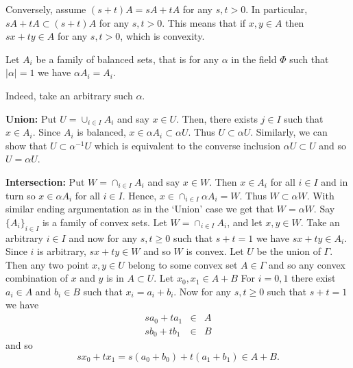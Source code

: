 \begin{enumerate}
\begin{itemize}
   Conversely, assume \((s+t)A = sA + tA\) for any \(s,t > 0\).
   In particular, \(sA + tA \subset (s+t)A\) for any \(s,t > 0\).
   This means that if \(x,y\in A\) then 
   \(sx+ty\in A\) for any \(s,t > 0\), which is convexity.

   Let \(A_i\) be a family of balanced sets, that is for any 
   \(\alpha\) in the field \(\Phi\) such that \(|\alpha| = 1\)
   we have \(\alpha A_i = A_i\).

   Indeed, take an arbitrary such \(\alpha\).

   \textbf{Union:}
   Put \(U = \cup_{i\in I} A_i\) and say \(x \in U\).
   Then, there exists \(j \in I\) such that \(x\in A_i\).
   Since \(A_i\) is balanced, \(x \in \alpha A_i \subset \alpha U\).
   Thus \(U \subset \alpha U\).
   Similarly, we can show that \(U \subset \alpha^{-1} U\)
   which is equivalent to the converse inclusion
   \(\alpha U \subset U\) and so  \(U = \alpha U\).

   \textbf{Intersection:}
   Put \(W = \cap_{i\in I} A_i\) and say \(x \in W\).
   Then \(x \in A_i\) for all \(i \in I\) and in turn
   so \(x \in \alpha A_i\) for all \(i \in I\).
   Hence, \(x \in \cap_{i\in I} \alpha A_i = W\).
   Thus \(W \subset \alpha W\). With similar ending argumentation
   as in the `Union' case we get that \(W = \alpha W\).
  Say \(\{A_i\}_{i\in I}\) is a family of convex sets.
  Let \(W = \cap_{i\in I} A_i\), and let \(x,y \in W\).
  Take an arbitrary \(i \in I\) and now
  for any \(s,t\geq 0\) such that \(s+t=1\) 
  we have \(sx+ty \in A_i\). Since $i$ is arbitrary, 
  \(sx+ty \in W\) and so $W$ is convex.
  Let $U$ be the union of \(\Gamma\). Then any two point \(x,y\in U\)
  belong to some convex set \(A \in \Gamma\) and so any convex combination
  of $x$ and $y$ is in \(A\subset U\).
  Let \(x_0,x_1 \in A+B\)
  For \(i=0,1\) there exist \(a_i\in A\) and \(b_i \in B\) 
  such that \(x_i = a_i + b_i\).
  Now for any \(s,t\geq 0\) such that \(s+t=1\) 
  we have 
  \begin{eqnarray*}
    sa_0 + ta_1 &\in& A \\
    sb_0 + tb_1 &\in& B
  \end{eqnarray*}
  and so 
 \begin{equation*}
   sx_0 + tx_1 = s(a_0+b_0) + t(a_1+b_1)  \in A+B.
 \end{equation*}


\end{itemize}
\end{enumerate}

